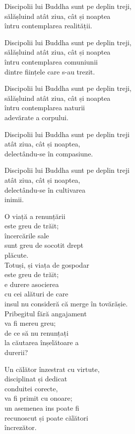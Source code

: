 Discipolii lui Buddha sunt pe deplin treji,\\
sălășluind atât ziua, cât și noaptea\\
întru contemplarea realității.


Discipolii lui Buddha sunt pe deplin treji,\\
sălășluind atât ziua, cât și noaptea\\
întru contemplarea comuniunii\\
dintre ființele care s-au trezit.


Discipolii lui Buddha sunt pe deplin treji,\\
sălășluind atât ziua, cât și noaptea\\
întru contemplarea naturii\\
adevărate a corpului.


Discipolii lui Buddha sunt pe deplin treji\\
atât ziua, cât și noaptea,\\
delectându-se în compasiune.


Discipolii lui Buddha sunt pe deplin treji\\
atât ziua, cât și noaptea,\\
delectându-se în cultivarea\\
inimii.


O viață a renunțării\\
este greu de trăit;\\
încercările sale\\
sunt greu de socotit drept\\
plăcute.\\
Totuși, și viața de gospodar\\
este greu de trăit;\\
e durere asocierea\\
cu cei alături de care\\
insul nu consideră că merge în tovărășie.\\
Pribegitul fără angajament\\
va fi mereu greu;\\
de ce să nu renunțați\\
la căutarea înșelătoare a\\
durerii?


Un călător înzestrat cu virtute,\\
disciplinat și dedicat\\
conduitei corecte,\\
va fi primit cu onoare;\\
un asemenea ins poate fi\\
recunoscut și poate călători\\
încrezător.


